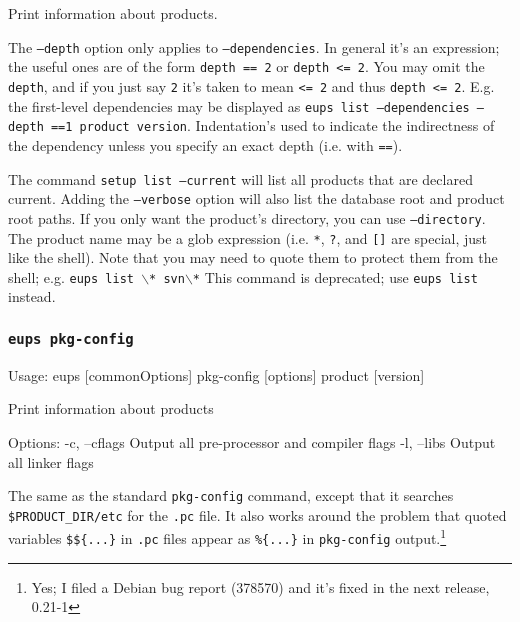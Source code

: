 \documentclass{article}
\newcommand{\code}[1]{\texttt{#1}}
\let\overbatim=\verbatim
\let\oendverbatim=\endverbatim
\renewenvironment{verbatim}
{\center\minipage{16cm}\overbatim}
{\oendverbatim\endminipage\endcenter}
\begin{document}
Print information about products.

The \code{--depth} option only applies to \code{--dependencies}. In general it's
an expression; the useful ones are of the form \code{depth == 2} or \code{depth <= 2}.
You may omit the \code{depth}, and if you just say \code{2} it's taken to mean \code{<= 2}
and thus \code{depth <= 2}.  E.g. the first-level dependencies may be displayed as
\code{eups list --dependencies --depth ==1 product version}.  Indentation's used to
indicate the indirectness of the dependency unless you specify an exact depth (i.e. with \code{==}).

The command \code{setup list --current} will list all products that
are declared current. Adding the \code{--verbose} option will also
list the database root and product root paths.  If you only want the product's
directory, you can use \code{--directory}.
The product name may be a glob expression (i.e. \code{*}, \code{?},
and \code{[]} are special, just like the shell).  Note that you may
need to quote them to protect them from the shell; e.g. \code{eups list $\backslash$* svn$\backslash$*}
This command is deprecated; use \code{eups list} instead.


\subsubsection{\code{eups pkg-config}}
\begin{verbatim}
Usage:
    eups [commonOptions] pkg-config [options] product [version]

Print information about products

Options:
   -c, --cflags            Output all pre-processor and compiler flags
   -l, --libs              Output all linker flags
\end{verbatim}

The same as the standard \code{pkg-config} command, except that it
searches \code{\$PRODUCT\_DIR/etc} for the \code{.pc} file.  It also
works around the problem that quoted variables \code{\$\$\{...\}}
in \code{.pc} files appear as \code{\%\{...\}} in \code{pkg-config} output.\footnote{
  Yes; I filed a Debian bug report (378570) and it's fixed in the next release, 0.21-1}
  
\end{document}
